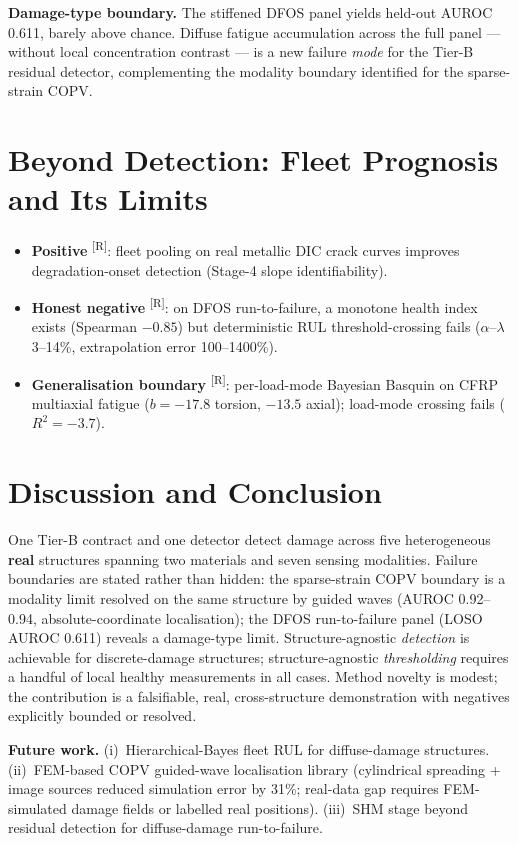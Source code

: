 \documentclass[10pt]{llncs}      %
\newcommand{\tagR}{\textsuperscript{[R]}}
\begin{document}
\textbf{Damage-type boundary.}
The stiffened DFOS panel yields held-out AUROC 0.611, barely above chance.
Diffuse fatigue accumulation across the full panel --- without local
concentration contrast --- is a new failure \emph{mode} for the Tier-B residual
detector, complementing the modality boundary identified for the sparse-strain
COPV.

\section{Beyond Detection: Fleet Prognosis and Its Limits}
\label{sec:prognosis}

\begin{itemize}
  \item \textbf{Positive} \tagR: fleet pooling on real metallic DIC crack curves
        improves degradation-onset detection (Stage-4 slope identifiability).
  \item \textbf{Honest negative} \tagR: on DFOS run-to-failure, a monotone
        health index exists (Spearman $-0.85$) but deterministic RUL
        threshold-crossing fails ($\alpha$--$\lambda$ 3--14\%, extrapolation
        error 100--1400\%).
  \item \textbf{Generalisation boundary} \tagR: per-load-mode Bayesian Basquin
        on CFRP multiaxial fatigue ($b = -17.8$ torsion, $-13.5$ axial);
        load-mode crossing fails ($R^2 = -3.7$).
\end{itemize}

\section{Discussion and Conclusion}
\label{sec:conclusion}

One Tier-B contract and one detector detect damage across five heterogeneous
\textbf{real} structures spanning two materials and seven sensing modalities.
Failure boundaries are stated rather than hidden: the sparse-strain COPV
boundary is a modality limit resolved on the same structure by guided waves
(AUROC 0.92--0.94, absolute-coordinate localisation); the DFOS run-to-failure
panel (LOSO AUROC 0.611) reveals a damage-type limit.
Structure-agnostic \emph{detection} is achievable for discrete-damage structures;
structure-agnostic \emph{thresholding} requires a handful of local healthy
measurements in all cases.
Method novelty is modest; the contribution is a falsifiable, real,
cross-structure demonstration with negatives explicitly bounded or resolved.

\textbf{Future work.}
(i)~Hierarchical-Bayes fleet RUL for diffuse-damage structures.
(ii)~FEM-based COPV guided-wave localisation library (cylindrical spreading +
image sources reduced simulation error by 31\%; real-data gap requires
FEM-simulated damage fields or labelled real positions).
(iii)~SHM stage beyond residual detection for diffuse-damage run-to-failure.

\printbibliography
\end{document}
